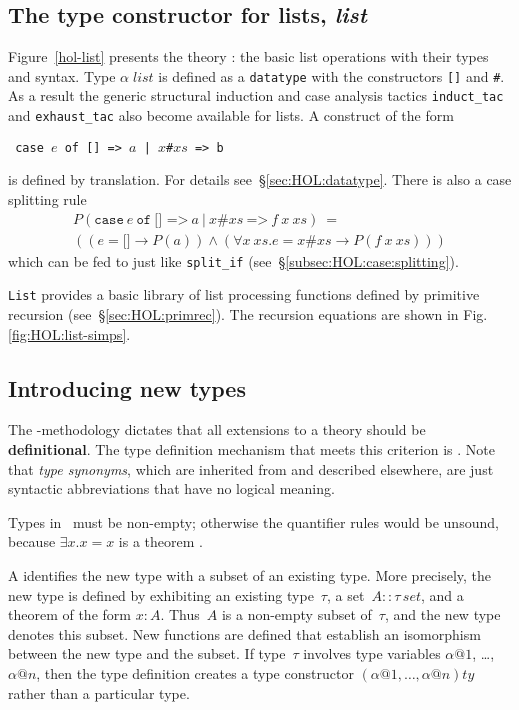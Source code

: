 \subsection{The type constructor for lists, \textit{list}}
\label{subsec:list}

Figure~\ref{hol-list} presents the theory : the basic list
operations with their types and syntax.  Type $\alpha \; list$ is
defined as a \texttt{datatype} with the constructors {\tt[]} and {\tt\#}.
As a result the generic structural induction and case analysis tactics
\texttt{induct\_tac} and \texttt{exhaust\_tac} also become available for
lists.  A  construct of the form
\begin{center}\tt
case $e$ of [] => $a$  |  \(x\)\#\(xs\) => b
\end{center}
is defined by translation.  For details see~\S\ref{sec:HOL:datatype}. There
is also a case splitting rule 
\[
\begin{array}{l}
P(\mathtt{case}~e~\mathtt{of}~\texttt{[] =>}~a ~\texttt{|}~
               x\texttt{\#}xs~\texttt{=>}~f~x~xs) ~= \\
((e = \texttt{[]} \to P(a)) \land
 (\forall x~ xs. e = x\texttt{\#}xs \to P(f~x~xs)))
\end{array}
\]
which can be fed to  just like
\texttt{split_if} (see~\S\ref{subsec:HOL:case:splitting}).

\texttt{List} provides a basic library of list processing functions defined by
primitive recursion (see~\S\ref{sec:HOL:primrec}).  The recursion equations
are shown in Fig.\ts\ref{fig:HOL:list-simps}.



\subsection{Introducing new types} \label{sec:typedef}

The \HOL-methodology dictates that all extensions to a theory should
be \textbf{definitional}.  The type definition mechanism that
meets this criterion is .  Note that \emph{type synonyms},
which are inherited from {\Pure} and described elsewhere, are just
syntactic abbreviations that have no logical meaning.

\begin{warn}
  Types in \HOL\ must be non-empty; otherwise the quantifier rules would be
  unsound, because $\exists x. x=x$ is a theorem \cite[\S7]{paulson-COLOG}.
\end{warn}
A  identifies the new type with a subset of
an existing type.  More precisely, the new type is defined by
exhibiting an existing type~$\tau$, a set~$A::\tau\,set$, and a
theorem of the form $x:A$.  Thus~$A$ is a non-empty subset of~$\tau$,
and the new type denotes this subset.  New functions are defined that
establish an isomorphism between the new type and the subset.  If
type~$\tau$ involves type variables $\alpha@1$, \ldots, $\alpha@n$,
then the type definition creates a type constructor
$(\alpha@1,\ldots,\alpha@n)ty$ rather than a particular type.

